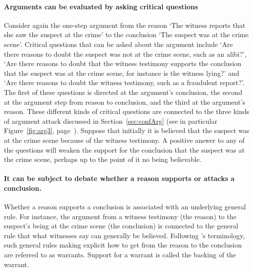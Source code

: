 \documentclass[10pt]{article}
\begin{document}


\paragraph{Arguments can be evaluated by asking critical questions} %
Consider again the one-step argument from the reason `The witness reports that she saw the suspect at the crime' to the conclusion `The suspect was at the crime scene'. 
Critical questions that can be asked about the argument include `Are there reasons to doubt the suspect was not at the crime scene, such as an alibi?', `Are there reasons to doubt that the witness testimony supports the conclusion that the suspect was at the crime scene, for instance is the witness lying?' and `Are there reasons to doubt the witness testimony, such as a fraudulent report?'. The first of these questions is directed at the argument's conclusion, the second at the argument step from reason to conclusion, and the third at the argument's reason. These different kinds of critical questions are connected to the three kinds of argument attack discussed in Section~\ref{sec:confArg} (see in particular Figure~\ref{fig:arg3}, page~\pageref{fig:arg3}). 
Suppose that initially it is believed that the suspect was at the crime scene because of the witness testimony. A positive answer to any of the questions will weaken the support for the conclusion that the suspect was at the crime scene, perhaps up to the point of it no being believable.

\paragraph{It can be subject to debate whether a reason supports or attacks a conclusion.} 
Whether a reason supports a conclusion is associated with an underlying general rule. For instance, the argument from a witness testimony (the reason) to the suspect's being at the crime scene (the conclusion) is connected to the general rule that what witnesses say can generally be believed. Following \cite{toulmin1958}'s terminology, such general rules making explicit how to get from the reason to the conclusion are referred to as warrants. Support for a warrant is called the backing of the warrant.
\end{document}

